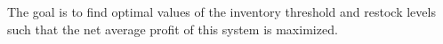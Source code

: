  The goal is to find optimal values of the inventory threshold and restock levels such that the net average profit of this system is maximized.  
%
%
%     
%
%
